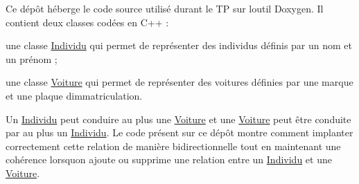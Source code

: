 Ce dépôt héberge le code source utilisé durant le TP sur l\textquotesingle{}outil Doxygen. Il contient deux classes codées en C++ \+:


\begin{DoxyItemize}
\item une classe \mbox{\hyperlink{class_individu}{Individu}} qui permet de représenter des individus définis par un nom et un prénom ;
\item une classe \mbox{\hyperlink{class_voiture}{Voiture}} qui permet de représenter des voitures définies par une marque et une plaque d\textquotesingle{}immatriculation.
\end{DoxyItemize}

Un \mbox{\hyperlink{class_individu}{Individu}} peut conduire au plus une \mbox{\hyperlink{class_voiture}{Voiture}} et une \mbox{\hyperlink{class_voiture}{Voiture}} peut être conduite par au plus un \mbox{\hyperlink{class_individu}{Individu}}. Le code présent sur ce dépôt montre comment implanter correctement cette relation de manière bidirectionnelle tout en maintenant une cohérence lorsqu\textquotesingle{}on ajoute ou supprime une relation entre un \mbox{\hyperlink{class_individu}{Individu}} et une \mbox{\hyperlink{class_voiture}{Voiture}}. 